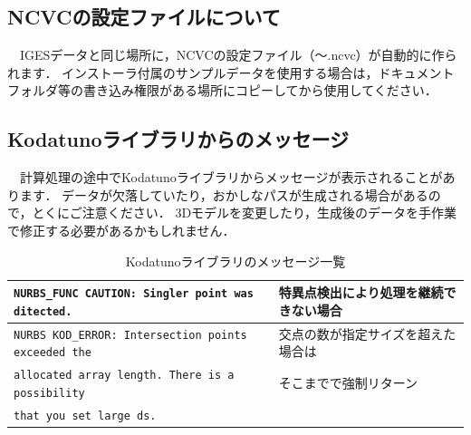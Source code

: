 \subsection{NCVCの設定ファイルについて}
　IGESデータと同じ場所に，NCVCの設定ファイル（～.ncvc）が自動的に作られます．
インストーラ付属のサンプルデータを使用する場合は，ドキュメントフォルダ等の書き込み権限がある場所にコピーしてから使用してください．

\subsection{Kodatunoライブラリからのメッセージ}
\label{sec:KodatunoMsg}
　計算処理の途中でKodatunoライブラリからメッセージが表示されることがあります．
データが欠落していたり，おかしなパスが生成される場合があるので，とくにご注意ください．
3Dモデルを変更したり，生成後のデータを手作業で修正する必要があるかもしれません．

\begin{table}[H]
\centering
\caption{Kodatunoライブラリのメッセージ一覧}
\label{tab:kodatuno_msg}
\begin{tabular}{l|l}
\hline
\texttt{NURBS\_FUNC CAUTION: Singler point was ditected.} & 特異点検出により処理を継続できない場合 \\ \hline
\texttt{NURBS KOD\_ERROR: Intersection points exceeded the} & 交点の数が指定サイズを超えた場合は \\
\texttt{allocated array length. There is a possibility} & そこまでで強制リターン \\
\texttt{that you set large ds.} & \\ \hline
\end{tabular}
\end{table}

